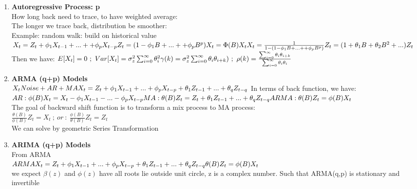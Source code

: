 \documentclass[10pt,landscape]{article}
\begin{document}
\begin{multicols}{3}
\begin{enumerate}
  \item \textbf{Autoregressive Process: p}\\
  		How long back need to trace, to have weighted average:\\
  		The longer we trace back, distribution be smoother:\\
  		Example: random walk: build on historical value\\
		$
		X_t = Z_t + \phi_1X_{t-1} + ... + + \phi_pX_{t-p}\\
		Z_t = (1-\phi_1B + ... + + \phi_pB^p)X_{t}= \Phi(B)X_t\\
		X_t = \frac{1}{1-(1-\phi_1B + ... + + \phi_pB^p)}Z_t = (1+\theta_1B+\theta_2B^2+...)Z_t
		$
		\newline
		\newline
		Then we have:
		$
		E[X_t] = 0 \ ;\ Var[X_t] = \sigma_z^2 \sum_{i=0}^{\infty}\theta_i^2\\
		\gamma(k) = \sigma_z^2 \sum_{i=0}^{\infty} \theta_i\theta_{i+k}) \ ;\ \rho(k) = \frac{\sum_{i=0}^{\infty} \theta_i\theta_{i+k}}{\sum_{i=0}^{\infty} \theta_i\theta_{i}}
		$
		
  		
  \item \textbf{ARMA (q+p) Models}\\
  		$
  		X_t Noise + AR+MA\\
  		X_t = Z_t + \phi_1 X_{t-1} +...+ \phi_p X_{t-p} + \theta_1Z_{t-1}+...+\theta_qZ_{t-q}
  		$
  		In terms of back function, we have:\\
  		$
  		AR: \phi(B)X_t = X_t - \phi_1X_{t-1}-...-\phi_pX_{t-p} \\ 		
  		MA: \theta(B)Z_t = Z_t + \theta_1Z_{t-1} +...+ \theta_qZ_{t-q}\\
  		ARMA: \theta(B)Z_t = \phi(B)X_t
  		$\\
  		
  		The goal of backward shift function is to transform a mix process to MA process:\\
  		$
  		\frac{\theta(B)}{\phi(B)}Z_t = X_t \ ;\ or\ :\ \frac{\phi(B)}{\theta(B)}Z_t = Z_t
  		$\\
  		
  		We can solve by geometric Series Transformation
  		
  \item \textbf{ARIMA (q+p) Models}\\
  		From ARMA\\
  		$
  		ARMA\\
  		X_t = Z_t + \phi_1 X_{t-1} +...+ \phi_p X_{t-p} + \theta_1Z_{t-1}+...+\theta_qZ_{t-q}\\
  		\theta(B)Z_t = \phi(B)X_t
  		$\\
  		we expect $\beta(z)$ and $\phi(z)$ have all roots lie outside unit circle, z is a complex number. Such that ARMA(q,p) is stationary and invertible\\
  		

\end{enumerate}
\end{multicols}
\end{document}
